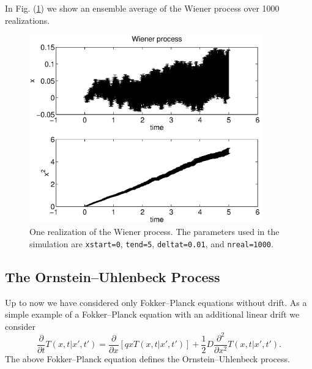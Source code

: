 In Fig. (\ref{F_WIENER}) we show an ensemble average of the
Wiener process over 1000 realizations.
\begin{figure}
\label{F_WIENER}
\includegraphics[width=10cm]{./Figures/f_wiener.eps}
\caption{One realization of the Wiener process.
The parameters used in the simulation are \texttt{xstart=0},
\texttt{tend=5}, \texttt{deltat=0.01}, and \texttt{nreal=1000}.}
\end{figure}

\subsection{The Ornstein--Uhlenbeck Process}
Up to now we have considered only Fokker--Planck equations 
without drift. 
As a simple example of a Fokker--Planck equation with an 
additional linear drift we consider
\begin{equation}
\label{ORNSTEIN}
\frac{\partial}{\partial t} T(x,t|x',t') = 
\frac{\partial}{\partial x} [qx T(x,t|x',t')] 
+ \frac{1}{2} D \frac{\partial^2}{\partial x^2} T(x,t|x',t').
\end{equation}
The above Fokker--Planck equation defines the Ornstein--Uhlenbeck
process. 


